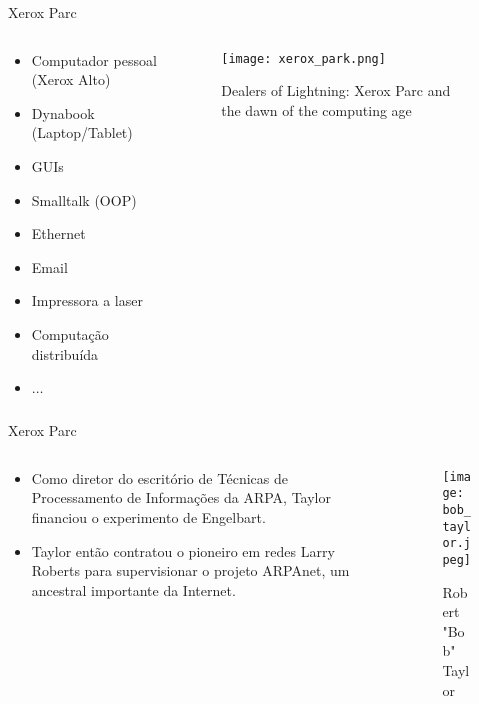 \documentclass{beamer}
\begin{document}
  \begin{frame}{Xerox Parc}
    \begin{columns}
        \begin{column}{0.5\textwidth}
            \begin{itemize}[<+->]
                \item<2-> Computador pessoal (Xerox Alto)
                \item<2-> Dynabook (Laptop/Tablet)
                \item<3-> GUIs
                \item<4-> Smalltalk (OOP)
                \item<5-> Ethernet
                \item<5-> Email
                \item<6-> Impressora a laser
                \item<7-> Computação distribuída
                \item<7-> $\ldots$
            \end{itemize}
        \end{column}
        \begin{column}{0.5\textwidth}
            \begin{figure}
            \centering
                \texttt{[image: xerox\_park.png]}
                \caption{Dealers of Lightning: Xerox Parc and the dawn of the computing age}
            \end{figure}
        \end{column}
    \end{columns}
  \end{frame}

  \begin{frame}{Xerox Parc}
    \begin{columns}
        \begin{column}{0.5\textwidth}
            \begin{itemize}[<+->]
                \item<2-> Como diretor do escritório de Técnicas de Processamento de Informações da ARPA, Taylor financiou o experimento de Engelbart.
                \item<3-> Taylor então contratou o pioneiro em redes Larry Roberts para supervisionar o projeto ARPAnet, um ancestral importante da Internet.
            \end{itemize}
        \end{column}
        \begin{column}{0.5\textwidth}
            \begin{figure}
            \centering
                \texttt{[image: bob\_taylor.jpeg]}
                \caption{Robert "Bob" \, Taylor}
            \end{figure}
        \end{column}
    \end{columns}
  \end{frame}
\end{document}
